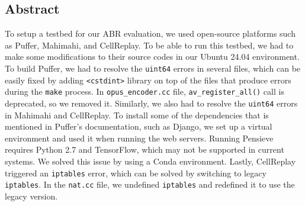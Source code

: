 \subsection{Abstract}\label{s:artifact_abstract}

To setup a testbed for our ABR evaluation, we used open-source platforms such as Puffer, Mahimahi, and CellReplay. To be able to run this testbed, we had to make some modifications to their source codes in our Ubuntu 24.04 environment. To build Puffer, we had to resolve the \texttt{uint64} errors in several files, which can be easily fixed by adding \texttt{<cstdint>} library on top of the files that produce errors during the \texttt{make} process. In \texttt{opus\_encoder.cc} file, \texttt{av\_register\_all()} call is deprecated, so we removed it. Similarly, we also had to resolve the \texttt{uint64} errors in Mahimahi and CellReplay. To install some of the dependencies that is mentioned in Puffer's documentation, such as Django, we set up a virtual environment and used it when running the web servers. Running Pensieve requires Python 2.7 and TensorFlow, which may not be supported in current systems. We solved this issue by using a Conda environment. Lastly, CellReplay triggered an \texttt{iptables} error, which can be solved by switching to legacy \texttt{iptables}. In the \texttt{nat.cc} file, we undefined \texttt{iptables} and redefined it to use the legacy version.


